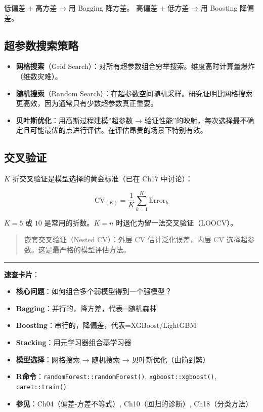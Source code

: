 \documentclass[
]{book}
\providecommand{\tightlist}{%
  \setlength{\itemsep}{0pt}\setlength{\parskip}{0pt}}
\begin{document}
低偏差 + 高方差 → 用 Bagging 降方差。
高偏差 + 低方差 → 用 Boosting 降偏差。

\subsection{超参数搜索策略}\label{ux8d85ux53c2ux6570ux641cux7d22ux7b56ux7565}

\begin{itemize}
\tightlist
\item
  \textbf{网格搜索}（Grid Search）：对所有超参数组合穷举搜索。维度高时计算量爆炸（维数灾难）。
\item
  \textbf{随机搜索}（Random Search）：在超参数空间随机采样。研究证明比网格搜索更高效，因为通常只有少数超参数真正重要。
\item
  \textbf{贝叶斯优化}：用高斯过程建模''超参数 → 验证性能''的映射，每次选择最不确定且可能最优的点进行评估。在评估昂贵的场景下特别有效。
\end{itemize}

\subsection{交叉验证}\label{ux4ea4ux53c9ux9a8cux8bc1}

\(K\) 折交叉验证是模型选择的黄金标准（已在 Ch17 中讨论）：

\[\text{CV}_{(K)} = \frac{1}{K} \sum_{k=1}^K \text{Error}_k\]

\(K = 5\) 或 \(10\) 是常用的折数。\(K = n\) 时退化为留一法交叉验证（LOOCV）。

\begin{quote}
嵌套交叉验证（Nested CV）：外层 CV 估计泛化误差，内层 CV 选择超参数。这是最严格的模型评估方法。
\end{quote}

\begin{center}\rule{0.5\linewidth}{0.5pt}\end{center}

\textbf{速查卡片}：

\begin{itemize}
\tightlist
\item
  \textbf{核心问题}：如何组合多个弱模型得到一个强模型？
\item
  \textbf{Bagging}：并行的，降方差，代表=随机森林
\item
  \textbf{Boosting}：串行的，降偏差，代表=XGBoost/LightGBM
\item
  \textbf{Stacking}：用元学习器组合基学习器
\item
  \textbf{模型选择}：网格搜索 → 随机搜索 → 贝叶斯优化（由简到繁）
\item
  \textbf{R命令}：\texttt{randomForest::randomForest()}, \texttt{xgboost::xgboost()}, \texttt{caret::train()}
\item
  \textbf{参见}：Ch04（偏差-方差不等式）, Ch10（回归的诊断）, Ch18（分类方法）
\end{itemize}
\end{document}
